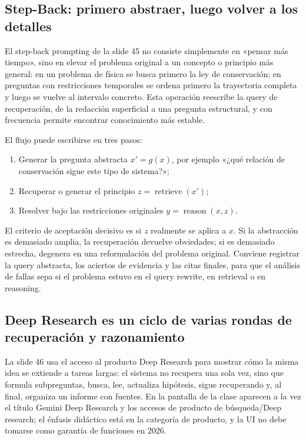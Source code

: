 \subsection{Step-Back: primero abstraer, luego volver a los detalles}

El step-back prompting de la slide 45 no consiste simplemente en «pensar más tiempo», sino en elevar el problema original a un concepto o principio más general: en un problema de física se busca primero la ley de conservación; en preguntas con restricciones temporales se ordena primero la trayectoria completa y luego se vuelve al intervalo concreto. Esta operación reescribe la query de recuperación, de la redacción superficial a una pregunta estructural, y con frecuencia permite encontrar conocimiento más estable.


El flujo puede escribirse en tres pasos:
\begin{enumerate}
  \item Generar la pregunta abstracta $x' = g(x)$, por ejemplo «¿qué relación de conservación sigue este tipo de sistema?»;
  \item Recuperar o generar el principio $z=\operatorname{retrieve}(x')$;
  \item Resolver bajo las restricciones originales $y=\operatorname{reason}(x,z)$.
\end{enumerate}
El criterio de aceptación decisivo es si $z$ realmente se aplica a $x$. Si la abstracción es demasiado amplia, la recuperación devuelve obviedades; si es demasiado estrecha, degenera en una reformulación del problema original. Conviene registrar la query abstracta, los aciertos de evidencia y las citas finales, para que el análisis de fallas sepa si el problema estuvo en el query rewrite, en retrieval o en reasoning.

\subsection{Deep Research es un ciclo de varias rondas de recuperación y razonamiento}

La slide 46 usa el acceso al producto Deep Research para mostrar cómo la misma idea se extiende a tareas largas: el sistema no recupera una sola vez, sino que formula subpreguntas, busca, lee, actualiza hipótesis, sigue recuperando y, al final, organiza un informe con fuentes. En la pantalla de la clase aparecen a la vez el título Gemini Deep Research y los accesos de producto de búsqueda/Deep research; el énfasis didáctico está en la categoría de producto, y la UI no debe tomarse como garantía de funciones en 2026.

